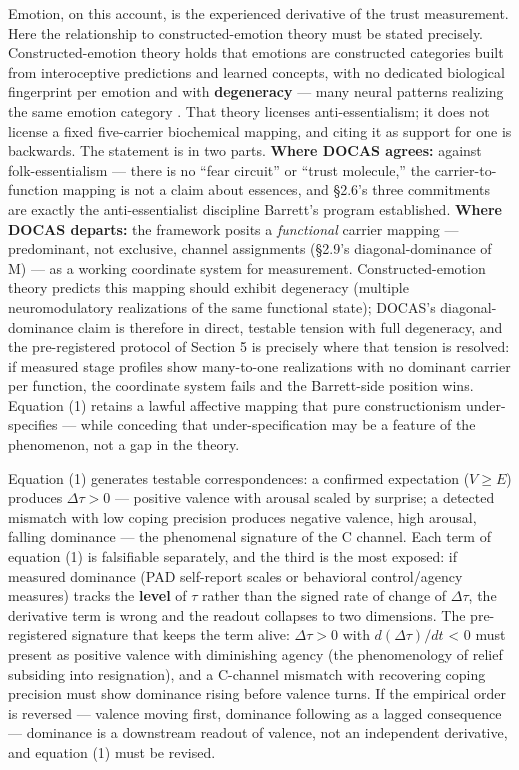 \documentclass[
]{article}
\begin{document}
Emotion, on this account, is the experienced derivative of the trust
measurement. Here the relationship to constructed-emotion theory must be
stated precisely. Constructed-emotion theory holds that emotions are
constructed categories built from interoceptive predictions and learned
concepts, with no dedicated biological fingerprint per emotion and with
\textbf{degeneracy} --- many neural patterns realizing the same emotion
category . That theory licenses anti-essentialism; it does not license a
fixed five-carrier biochemical mapping, and citing it as support for one
is backwards. The statement is in two parts. \textbf{Where DOCAS
agrees:} against folk-essentialism --- there is no ``fear circuit'' or
``trust molecule,'' the carrier-to-function mapping is not a claim about
essences, and §2.6's three commitments are exactly the anti-essentialist
discipline Barrett's program established. \textbf{Where DOCAS departs:}
the framework posits a \emph{functional} carrier mapping ---
predominant, not exclusive, channel assignments (§2.9's
diagonal-dominance of M) --- as a working coordinate system for
measurement. Constructed-emotion theory predicts this mapping should
exhibit degeneracy (multiple neuromodulatory realizations of the same
functional state); DOCAS's diagonal-dominance claim is therefore in
direct, testable tension with full degeneracy, and the pre-registered
protocol of Section 5 is precisely where that tension is resolved: if
measured stage profiles show many-to-one realizations with no dominant
carrier per function, the coordinate system fails and the Barrett-side
position wins. Equation (1) retains a lawful affective mapping that pure
constructionism under-specifies --- while conceding that
under-specification may be a feature of the phenomenon, not a gap in the
theory.

Equation (1) generates testable correspondences: a confirmed expectation
(\(V \geq E\)) produces \(\Delta\tau > 0\) --- positive valence with
arousal scaled by surprise; a detected mismatch with low coping
precision produces negative valence, high arousal, falling dominance ---
the phenomenal signature of the C channel. Each term of equation (1) is
falsifiable separately, and the third is the most exposed: if measured
dominance (PAD self-report scales or behavioral control/agency measures)
tracks the \textbf{level} of \(\tau\) rather than the signed rate of
change of \(\Delta\tau\), the derivative term is wrong and the readout
collapses to two dimensions. The pre-registered signature that keeps the
term alive: \(\Delta\tau > 0\) with \(d(\Delta\tau)/dt\) \textless{} 0
must present as positive valence with diminishing agency (the
phenomenology of relief subsiding into resignation), and a C-channel
mismatch with recovering coping precision must show dominance rising
before valence turns. If the empirical order is reversed --- valence
moving first, dominance following as a lagged consequence --- dominance
is a downstream readout of valence, not an independent derivative, and
equation (1) must be revised.
\end{document}

